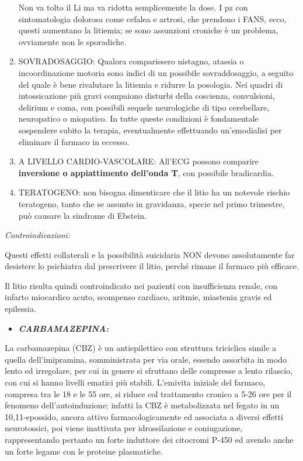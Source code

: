 \documentclass[]{article}
\begin{document}
\begin{enumerate}
  Non va tolto il Li ma va ridotta semplicemente la dose. I pz con
  sintomatologia dolorosa come cefalea e artrosi, che prendono i FANS,
  ecco, questi aumentano la litiemia; se sono assunzioni croniche è un
  problema, ovviamente non le sporadiche.
\item
  SOVRADOSAGGIO: Qualora comparissero nistagno, atassia o
  incoordinazione motoria sono indici di un possibile sovraddosaggio, a
  seguito del quale è bene rivalutare la litiemia e ridurre la
  posologia. Nei quadri di intossicazione più gravi compaiono disturbi
  della coscienza, convulsioni, delirium e coma, con possibili sequele
  neurologiche di tipo cerebellare, neuropatico o miopatico. In tutte
  queste condizioni è fondamentale sospendere subito la terapia,
  eventualmente effettuando un'emodialisi per eliminare il farmaco in
  eccesso.
\item
  A LIVELLO CARDIO-VASCOLARE: All'ECG possono comparire
  \textbf{inversione o appiattimento dell'onda T}, con possibile
  bradicardia.
\item
  TERATOGENO: non bisogna dimenticare che il litio ha un notevole
  rischio teratogeno, tanto che se assunto in gravidanza, specie nel
  primo trimestre, può causare la sindrome di Ebstein.
\end{enumerate}

\emph{\emph{Controindicazioni:}}

Questi effetti collaterali e la possibilità suicidaria NON devono
assolutamente far desistere lo psichiatra dal prescrivere il litio,
perché rimane il farmaco più efficace.

Il litio risulta quindi controindicato nei pazienti con insufficienza
renale, con infarto miocardico acuto, scompenso cardiaco, aritmie,
miastenia gravis ed epilessia.

\begin{itemize}
\item
  \textbf{\emph{CARBAMAZEPINA:}}
\end{itemize}

La carbamazepina (CBZ) è un antiepilettico con struttura triciclica
simile a quella dell'imipramina, somministrata per via orale, essendo
assorbita in modo lento ed irregolare, per cui in genere si sfruttano
delle compresse a lento rilascio, con cui si hanno livelli ematici più
stabili. L'emivita iniziale del farmaco, compresa tra le 18 e le 55 ore,
si riduce col trattamento cronico a 5-26 ore per il fenomeno
dell'autoinduzione; infatti la CBZ è metabolizzata nel fegato in un
10,11-epossido, ancora attivo farmacologicamente ed associata a diversi
effetti neurotossici, poi viene inattivata per idrossilazione e
coniugazione, rappresentando pertanto un forte induttore dei citocromi
P-450 ed avendo anche un forte legame con le proteine plasmatiche.
\end{document}
